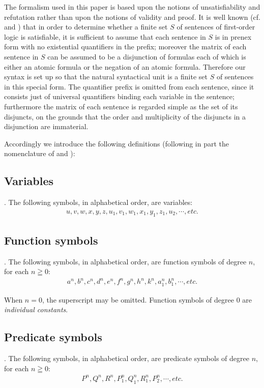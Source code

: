 \documentclass[8pt]{extarticle}
\begin{document}
The formalism used in this paper is based upon the notions of unsatisfiability and refutation rather than upon the notions of validity and proof. It is well known (cf. \cite{davis_1960} and \cite{robinson_1963}) that in order to determine whether a finite set $S$ of sentences of first-order logic is satisfiable, it is sufficient to assume that each sentence in $S$ is in prenex form with no existential quantifiers in the prefix; moreover the matrix of each sentence in $S$ can be assumed to be a disjunction of formulas each of which is either an atomic formula or the negation of an atomic formula. Therefore our syntax is set up so that the natural syntactical unit is a finite set $S$ of sentences in this special form. The quantifier prefix is omitted from each sentence, since it consists just of universal quantifiers binding each variable in the sentence; furthermore the matrix of each sentence is regarded simple as the set of its disjuncts, on the grounds that the order and multiplicity of the disjuncts in a disjunction are immaterial.

Accordingly we introduce the following definitions (following in part the nomenclature of \cite{davis_1960} and \cite{robinson_1963}):\\
\subsection{Variables}. The following symbols, in alphabetical order, are variables:
\begin{align*}
    u, v, w, x, y, z, u_1 , v_1 , w_1 , x_1 , y_1 , z_1 , u_2 , \dotsm , etc.
\end{align*}
\newpage

\subsection{Function symbols}. The following symbols, in alphabetical order, are function symbols of degree $n$, for each $n\geqq0$:
\begin{align*}
    a^n,b^n,c^n,d^n,e^n,f^n,g^n,h^n,k^n,a_1^n,b_1^n,\dotsm, etc.
\end{align*}

\noindent When $n = 0$, the superscript may be omitted. Function symbols of degree 0 are \emph{individual constants}.

\subsection{Predicate symbols}. The following symbols, in alphabetical order, are predicate symbols of degree $n$, for each $n\geqq0$:
\begin{align*}
    P^n,Q^n,R^n,P_1^n,Q_1^n,R_1^n,P_2^n,\dotsm, etc.
\end{align*}
\end{document}
